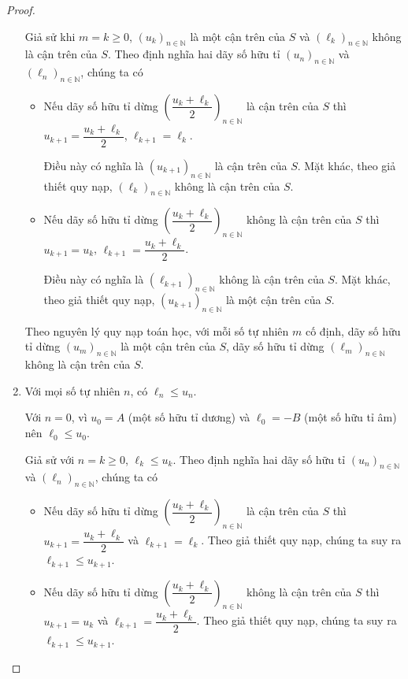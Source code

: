 \begin{proof}
\begin{enumerate}[label={\textbf{Tính chất \arabic*.}},itemindent=1.7cm]
              Giả sử khi $m = k\geq 0$, ${(u_{k})}_{n\in\mathbb{N}}$ là một cận trên của $S$ và ${(\ell_{k})}_{n\in\mathbb{N}}$ không là cận trên của $S$. Theo định nghĩa hai dãy số hữu tỉ ${(u_{n})}_{n\in\mathbb{N}}$ và ${(\ell_{n})}_{n\in\mathbb{N}}$, chúng ta có
              \begin{itemize}
                  \item Nếu dãy số hữu tỉ dừng ${\left(\dfrac{u_{k}+\ell_{k}}{2}\right)}_{n\in\mathbb{N}}$ là cận trên của $S$ thì $u_{k+1} = \dfrac{u_{k} + \ell_{k}}{2}$, $\ell_{k+1} = \ell_{k}$.

                        Điều này có nghĩa là ${(u_{k+1})}_{n\in\mathbb{N}}$ là cận trên của $S$. Mặt khác, theo giả thiết quy nạp, ${(\ell_{k})}_{n\in\mathbb{N}}$ không là cận trên của $S$.
                  \item Nếu dãy số hữu tỉ dừng ${\left(\dfrac{u_{k}+\ell_{k}}{2}\right)}_{n\in\mathbb{N}}$ không là cận trên của $S$ thì $u_{k+1} = u_{k}$, $\ell_{k+1} = \dfrac{u_{k}+\ell_{k}}{2}$.

                        Điều này có nghĩa là ${(\ell_{k+1})}_{n\in\mathbb{N}}$ không là cận trên của $S$. Mặt khác, theo giả thiết quy nạp, ${(u_{k+1})}_{n\in\mathbb{N}}$ là một cận trên của $S$.
              \end{itemize}

              Theo nguyên lý quy nạp toán học, với mỗi số tự nhiên $m$ cố định, dãy số hữu tỉ dừng ${(u_{m})}_{n\in\mathbb{N}}$ là một cận trên của $S$, dãy số hữu tỉ dừng ${(\ell_{m})}_{n\in\mathbb{N}}$ không là cận trên của $S$.
        \item Với mọi số tự nhiên $n$, có $\ell_{n}\leq u_{n}$.

              Với $n = 0$, vì $u_{0} = A$ (một số hữu tỉ dương) và $\ell_{0} = -B$ (một số hữu tỉ âm) nên $\ell_{0}\leq u_{0}$.

              Giả sử với $n = k\geq 0$, $\ell_{k}\leq u_{k}$. Theo định nghĩa hai dãy số hữu tỉ ${(u_{n})}_{n\in\mathbb{N}}$ và ${(\ell_{n})}_{n\in\mathbb{N}}$, chúng ta có
              \begin{itemize}
                  \item Nếu dãy số hữu tỉ dừng ${\left(\dfrac{u_{k}+\ell_{k}}{2}\right)}_{n\in\mathbb{N}}$ là cận trên của $S$ thì $u_{k+1} = \dfrac{u_{k} + \ell_{k}}{2}$ và $\ell_{k+1} = \ell_{k}$. Theo giả thiết quy nạp, chúng ta suy ra $\ell_{k+1}\leq u_{k+1}$.
                  \item Nếu dãy số hữu tỉ dừng ${\left(\dfrac{u_{k}+\ell_{k}}{2}\right)}_{n\in\mathbb{N}}$ không là cận trên của $S$ thì $u_{k+1} = u_{k}$ và $\ell_{k+1} = \dfrac{u_{k} + \ell_{k}}{2}$. Theo giả thiết quy nạp, chúng ta suy ra $\ell_{k+1}\leq u_{k+1}$.
              \end{itemize}


\end{enumerate}
\end{proof}
